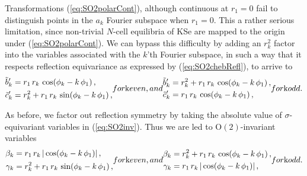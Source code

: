 \documentclass[aip,cha,showpacs,twocolumn,
 		  reprint]{revtex4-1} %
\newcommand{\bseq}{\begin{subequations}}
\newcommand{\eseq}{\end{subequations}}
\newcommand{\refeq}  [1] {(\ref{#1})}
\newcommand{\On}[1]{\ensuremath{\textrm{O}(#1)}}
\newcommand{\Refl}{\ensuremath{\sigma}}
\begin{document}
Transformations \refeq{eq:SO2polarCont}, although continuous at
$r_1=0$ fail to distinguish points in the $a_k$ Fourier subspace when $r_1=0$.
This a rather serious limitation, since non-trivial $N$-cell equilibria of
KSe are mapped to the origin under \refeq{eq:SO2polarCont}.
We can bypass this difficulty by adding an $r_k^2$ factor into the variables
associated with the $k$'th Fourier subspace, in such a way that it respects
reflection equivariance as expressed by \refeq{eq:SO2chebRefl}, to arrive to
\bseq\label{eq:SO2inv}
  \begin{align}
    \tilde{b}'_k &=
		    r_1\,r_k\, \cos(\phi_k-k\,\phi_1)\,, \\
    \tilde{c}'_k &=
		    r_k^2+r_1\,r_k\,\sin(\phi_k-k\,\phi_1)\,,
  \end{align}
for $k$ even, and
  \begin{align}
    \tilde{b}'_k &=
		    r_k^2+r_1\,r_k\, \cos(\phi_k-k\,\phi_1)\,, \\
    \tilde{c}'_k &=
		    r_1\,r_k\, \cos(\phi_k-k\,\phi_1)\,,
  \end{align}
for $k$ odd.
\eseq

As before, we factor out reflection symmetry by taking the absolute value
of $\Refl$-equivariant variables in \refeq{eq:SO2inv}.
Thus we are led to $\On{2}$-invariant variables
\bseq\label{eq:O2inv}
  \begin{align}
    \beta_k &=
		    r_1\,r_k\, |\cos(\phi_k-k\,\phi_1)|\,, \\
    \gamma_k &=
		    r_k^2+r_1\,r_k\,\sin(\phi_k-k\,\phi_1)\,,
  \end{align}
for $k$ even, and
  \begin{align}
    \beta_k &=
		    r_k^2+r_1\,r_k\, \cos(\phi_k-k\,\phi_1)\,, \\
    \gamma_k &=
		    r_1\,r_k\, |\cos(\phi_k-k\,\phi_1)|\,,
  \end{align}
for $k$ odd.
\eseq
\end{document}
